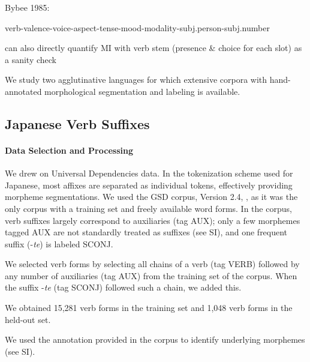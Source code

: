 
Bybee 1985:

verb-valence-voice-aspect-tense-mood-modality-subj.person-subj.number

can also directly quantify MI with verb stem (presence \& choice for each slot) as a sanity check

We study two agglutinative languages for which extensive corpora with hand-annotated morphological segmentation and labeling is available.

\subsection{Japanese Verb Suffixes}


\paragraph{Data Selection and Processing}
We drew on Universal Dependencies data.
In the tokenization scheme used for Japanese, most affixes are separated as individual tokens, effectively providing morpheme segmentations.
We used the GSD corpus, Version 2.4, \citep{tanaka2016universal, asahara2018universal}, as it was the only corpus with a training set and freely available word forms.
In the corpus, verb suffixes largely correspond to auxiliaries (tag AUX); only a few morphemes tagged AUX are not standardly treated as suffixes (see SI), and one frequent suffix (-\textit{te}) is labeled SCONJ.

We selected verb forms by selecting all chains of a verb (tag VERB) followed by any number of auxiliaries (tag AUX) from the training set of the corpus. When the suffix -\textit{te} (tag SCONJ) followed such a chain, we added this.

We obtained 15,281 verb forms in the training set and 1,048 verb forms in the held-out set.

We used the annotation provided in the corpus to identify underlying morphemes (see SI).



